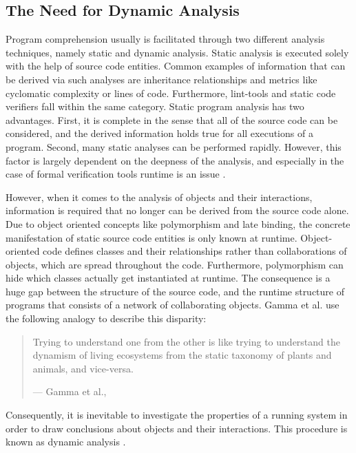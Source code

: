 \subsection{The Need for Dynamic Analysis}
\label{ss:BackgroundAnalysisNeccessity}
Program comprehension usually is facilitated through two different analysis techniques, namely static and dynamic analysis.
Static analysis is executed solely with the help of source code entities.
Common examples of information that can be derived via such analyses are inheritance relationships and metrics like cyclomatic complexity or lines of code.
Furthermore, lint-tools and static code verifiers fall within the same category.
Static program analysis has two advantages.
First, it is complete in the sense that all of the source code can be considered, and the derived information holds true for all executions of a program.
Second, many static analyses can be performed rapidly.
However, this factor is largely dependent on the deepness of the analysis, and especially in the case of formal verification tools runtime is an issue \cite{wichmann_industrial_1995}.

However, when it comes to the analysis of objects and their interactions, information is required that no longer can be derived from the source code alone.
Due to object oriented concepts like polymorphism and late binding, the concrete manifestation of static source code entities is only known at runtime.
Object-oriented code defines classes and their relationships rather than collaborations of objects, which are spread throughout the code.
Furthermore, polymorphism can hide which classes actually get instantiated at runtime.
The consequence is a huge gap between the structure of the source code, and the runtime structure of programs that consists of a network of collaborating objects.
Gamma et al. use the following analogy to describe this disparity:

\begin{quote}
Trying to understand one from the other is like trying to understand the dynamism of living ecosystems from the static taxonomy of plants and animals, and vice-versa.
\par\raggedleft--- \textup{Gamma et al.}, \cite{gamma_design_1995}
\end{quote}

Consequently, it is inevitable to investigate the properties of a running system in order to draw conclusions about objects and their interactions.
This procedure is known as dynamic analysis \cite{bell_concept_1999}.


